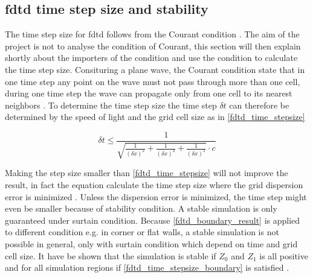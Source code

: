     \startexplain
    \stopexplain
    
    
    

\subsection{\gls{fdtd} time step size and stability}   \label{sec:fdtd_time_stepsize} 
The time step size for \gls{fdtd} follows from the Courant condition \citep{Kunz1993}. The aim of the project is not to analyse the condition of Courant, this section will then explain shortly about the importers of the condition and use the condition to calculate the time step size. Consituring a plane wave, the Courant condition state that in one time step any point on the wave must not pass through more than one cell, during one time step the wave can propagate only from one cell to its nearest neighbors \citep{Kunz1993}. To determine the time step size the time step $\delta t $ can therefore be determined by the speed of light and the grid cell size as in \autoref{fdtd_time_stepsize}



\begin{equation}\label{fdtd_time_stepsize}
\delta t \leq \frac{1}{\sqrt{\frac{1}{(\delta x)^2}+\frac{1}{(\delta x)^2}+\frac{1}{(\delta x)^2} }\cdot c}
\end{equation}
        \startexplain
    \stopexplain
    
Making the step size smaller than \autoref{fdtd_time_stepsize} will not improve the result, in fact the equation calculate the time step size where the grid dispersion error is minimized \citep{Kunz1993}. Unless the dispersion error is minimized, the time step might even be  smaller because of stability condition. 
A stable simulation is only guaranteed under surtain condition. Because \autoref{fdtd_boundary_result} is applied to different condition e.g. in corner or flat walls, a stable simulation is not possible in general, only with surtain condition which depend on time and grid cell size. It have be shown that the simulation is stable if $Z_0$ and $Z_{1}$ is all positive and for all simulation regions if \autoref{fdtd_time_stepsize_boundary} is satisfied \citep{finiteproblems}.

